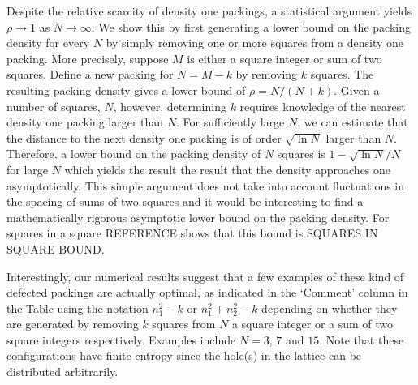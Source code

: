 Despite the relative scarcity of density one packings, a statistical argument yields $\rho \rightarrow 1$ as $N \rightarrow \infty$. We show this by first generating a lower bound on the packing density for every $N$ by simply removing one or more squares from a density one packing. More precisely, suppose $M$ is either a square integer or sum of two squares. Define a new packing for $N = M-k$ by removing $k$ squares. The resulting packing density gives a lower bound of $\rho=N/(N+k)$. Given a number of squares, $N$, however, determining $k$ requires knowledge of the nearest density one packing larger than $N$. For sufficiently large $N$, we can estimate that the distance to the next density one packing is of order $\sqrt{\ln N}$ larger than $N$. Therefore, a lower bound on the packing density of $N$ squares is $1-\sqrt{\ln N}/N$ for large $N$ which yields the result the result that the density approaches one asymptotically. This simple argument does not take into account fluctuations in the spacing of sums of two squares and it would be interesting to find a mathematically rigorous asymptotic lower bound on the packing density.  For squares in a square REFERENCE shows that this bound is SQUARES IN SQUARE BOUND.

Interestingly, our numerical results suggest that a few examples of these kind of defected packings are actually optimal, as indicated in the `Comment' column in the Table using the notation $n_1^2-k$ or $n_1^2+ n_2^2-k$ depending on whether they are generated by removing $k$ squares from $N$ a square integer or a sum of two square integers respectively. Examples include $N=3$, $7$ and $15$. Note that these configurations have finite entropy since the hole(s) in the lattice can be distributed arbitrarily.



